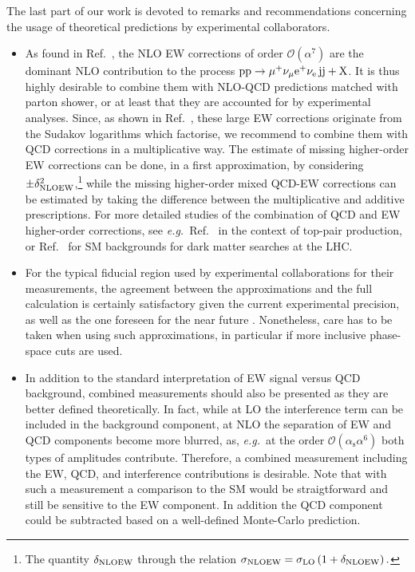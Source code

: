 \documentclass[twocolumn,epjc3]{svjour3} %
\newcommand{\Pj}{\ensuremath{\text{j}}\xspace}
\newcommand{\Pp}{\ensuremath{\text{p}}\xspace}
\newcommand{\alphas}{\ensuremath{\alpha_\text{s}}\xspace}
\begin{document}
The last part of our work is devoted to 
 remarks and recommendations concerning the usage of theoretical predictions by experimental collaborators.
 \begin{itemize} 
    \item As found in Ref.~\cite{Biedermann:2017bss}, the NLO EW corrections of order $\mathcal{O}{\left(\alpha^{7}\right)}$ are 
        the dominant NLO contribution to the process $\Pp\Pp\to\mu^+\nu_\mu{\rm e}^+\nu_{\rm e}\,\Pj\Pj+\mathrm{X}$.
        It is thus highly desirable to combine them with NLO-QCD predictions matched with parton shower, or at least that they are accounted for
        by experimental analyses. Since, as shown in Ref.~\cite{Biedermann:2016yds}, 
        these large EW corrections originate from the Sudakov logarithms which factorise, we recommend to combine them with QCD 
        corrections in a multiplicative way. The estimate of missing higher-order EW corrections can be done, 
        in a first approximation, by considering $\pm \delta^2_{\rm NLO EW}$,\footnote{The quantity $\delta_{\rm NLO EW}$ through the relation $\sigma_{\rm NLO EW} = \sigma_{\rm LO} \left(1+ \delta_{\rm NLO EW}\right).$} while the missing higher-order mixed QCD-EW corrections 
        can be estimated by taking the difference between the multiplicative and additive prescriptions.
        For more detailed studies of the combination of QCD and EW higher-order corrections, see
        \emph{e.g.}\, Ref.~\cite{Czakon:2017wor} in the context of top-pair production, or Ref.~\cite{Lindert:2017olm} for SM 
        backgrounds for dark matter searches at the LHC.
    \item For the typical fiducial region used by experimental collaborations for their measurements, 
        the agreement between the approximations and the full calculation is certainly satisfactory given 
        the current experimental precision, as well as the one foreseen for the near future \cite{CMSCollaboration:2015zni,CMS:2016rcn}.
        Nonetheless, care has to be taken when using such approximations, in particular if more inclusive phase-space cuts are used.

    \item In addition to the standard interpretation of EW signal versus QCD background, 
        combined measurements should also be presented as they are better defined theoretically. In fact, while at LO 
        the interference term can be included in the background component, at NLO the separation of EW and QCD components become more blurred, as, \emph{e.g.}\,
        at the order $\mathcal{O}{\left(\alphas\alpha^{6}\right)}$ both types of amplitudes contribute.
        Therefore, a combined measurement including the EW, QCD, and interference contributions is desirable.
        Note that with such a measurement a comparison to the SM would
        be straigtforward and still be sensitive to the EW component.
        In addition the QCD component could be subtracted based on a
        well-defined Monte-Carlo prediction.


\end{itemize}
\end{document}

